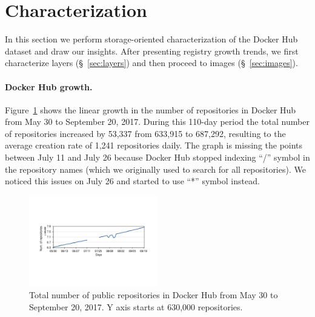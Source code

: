 \section{Characterization}
\label{sec:char}

In this section we perform storage-oriented characterization of the Docker Hub
dataset and draw our insights.
%
After presenting registry growth trends, we first characterize layers
(\S~\ref{sec:layers}) and then proceed to images (\S~\ref{sec:images}).
%
\paragraph{Docker Hub growth.} Figure~\ref{fig_image_growth} shows the linear
growth in the number of repositories in Docker Hub from May 30 to September 20,
2017.
%
%
During this 110-day period the total number of repositories increased by 53,337
from 633,915 to 687,292, resulting to the average
creation rate of 1,241 repositories daily.
%
The graph is missing the points between July 11 and July 26 because Docker Hub
stopped indexing ``/'' symbol in the repository names (which we originally used
to search for all repositories).
%
We noticed this issues on July 26 and started to use ``*'' symbol instead.


\begin{figure}
  \centering
  \includegraphics[width=0.5\textwidth]{graphs/image_growth.pdf}
  \caption{Total number of public repositories in Docker Hub
	   from May 30 to September 20, 2017. Y axis starts
	   at 630,000 repositories.
	  }
  \label{fig_image_growth}
\end{figure}



